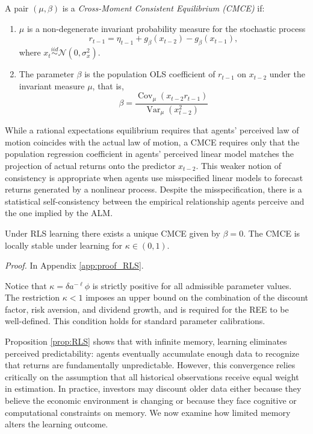 \begin{definition}\label{def:cmce}
A pair $(\mu,\beta)$ is a \emph{Cross-Moment Consistent Equilibrium (CMCE)} if:
\begin{enumerate}
    \item $\mu$ is a non-degenerate invariant probability measure for the 
    stochastic process
    \[
        r_{t-1}
        = \eta_{t-1}
        + g_{\beta}(x_{t-2})
        - g_{\beta}(x_{t-1}),
    \]
    where $x_t \stackrel{iid}{\sim} \mathcal{N}(0, \sigma^2_x)$.
    
    \item The parameter $\beta$ is the population OLS coefficient of $r_{t-1}$ 
    on $x_{t-2}$ under the invariant measure $\mu$, that is,
    \[
        \beta = \frac{\operatorname{Cov}_\mu(x_{t-2} r_{t-1})}{\operatorname{Var}_\mu(x_{t-2}^2)} 
    \]
\end{enumerate}
\end{definition}

While a rational expectations equilibrium requires that agents' perceived law of motion coincides with the actual law of motion, a CMCE requires only that the population regression coefficient in agents' perceived linear model matches the projection of actual returns onto the predictor $x_{t-2}$. 
This weaker notion of consistency is appropriate when agents use misspecified linear models to forecast returns generated by a nonlinear process. Despite the misspecification, there is a statistical self-consistency between the empirical relationship agents perceive and the one implied by the ALM.

\begin{proposition}\label{prop:RLS}
    Under RLS learning there exists a unique CMCE given by $\beta = 0$. The CMCE is locally stable under learning for $\kappa \in (0,1)$.
\end{proposition}

\textit{Proof.} In Appendix \ref{app:proof_RLS}.

Notice that $\kappa = \delta a^{-\ell} \phi$ is strictly positive for all admissible parameter values. The restriction $\kappa < 1$ imposes an upper bound on the combination of the discount factor, risk aversion, and dividend growth, and is required for the REE to be well-defined. This condition holds for standard parameter calibrations.

Proposition \ref{prop:RLS} shows that with infinite memory, learning eliminates perceived predictability: agents eventually accumulate enough data to recognize that returns are fundamentally unpredictable.
However, this convergence relies critically on the assumption that all historical observations receive equal weight in estimation. 
In practice, investors may discount older data either because they believe the economic environment is changing or because they face cognitive or computational constraints on memory. 
We now examine how limited memory alters the learning outcome.




